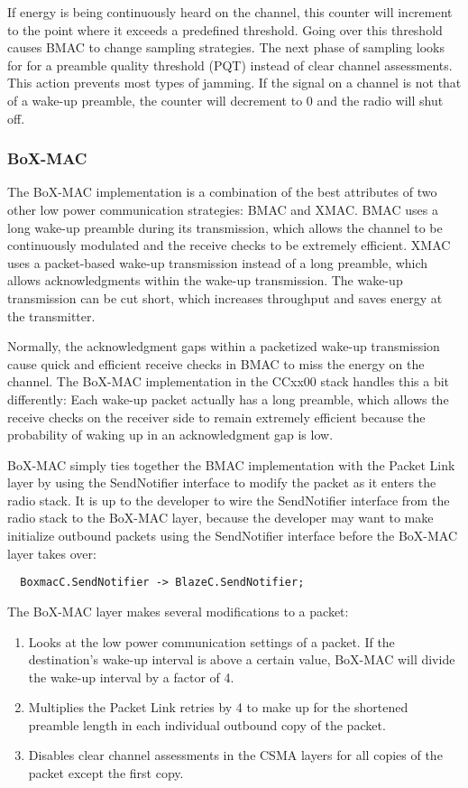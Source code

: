 \documentclass{article}
\begin{document}
If energy is being continuously heard on the channel, this counter will increment
to the point where it exceeds a predefined threshold. Going over this threshold
causes BMAC to change sampling strategies.  The next phase of sampling looks for
for a preamble quality threshold (PQT) instead of clear channel assessments.
This action prevents most types of jamming. If the signal on a channel is not
that of a wake-up preamble, the counter will decrement to 0 and the radio will
shut off.

\subsubsection{BoX-MAC}
\label{sec:boxmac}
The BoX-MAC \cite{boxmac} implementation is a combination of the best attributes of two other
low power communication strategies:  BMAC and XMAC.  BMAC uses a long wake-up 
preamble during its transmission, which allows the channel to be continuously 
modulated and the receive checks to be extremely efficient.  XMAC uses a packet-based
wake-up transmission instead of a long preamble, which allows acknowledgments within
the wake-up transmission. The wake-up transmission can be cut short, which increases 
throughput and saves energy at the transmitter. 

Normally, the acknowledgment gaps within a packetized wake-up transmission cause 
quick and efficient receive checks in BMAC to miss the energy on the channel. The
BoX-MAC implementation in the CCxx00 stack handles this a bit differently: Each
wake-up packet actually has a long preamble, which allows the receive checks on the
receiver side to remain extremely efficient because the probability of waking up 
in an acknowledgment gap is low.

BoX-MAC simply ties together the BMAC implementation with the Packet Link layer
by using the SendNotifier interface to modify the packet as it enters the radio
stack. It is up to the developer to wire the SendNotifier interface from the radio stack
to the BoX-MAC layer, because the developer may want to make initialize outbound packets using the
SendNotifier interface before the BoX-MAC layer takes over:

\begin{verbatim}
  BoxmacC.SendNotifier -> BlazeC.SendNotifier;
\end{verbatim}

The BoX-MAC layer makes several modifications to a packet:

\begin{enumerate}
  \item Looks at the low power communication settings of a packet. If the destination's
  wake-up interval is above a certain value, BoX-MAC will divide the wake-up interval
  by a factor of 4.
  \item Multiplies the Packet Link retries by 4 to make up for the shortened preamble
  length in each individual outbound copy of the packet.
  \item Disables clear channel assessments in the CSMA layers for all copies of the
  packet except the first copy.
\end{enumerate} 
\end{document}
